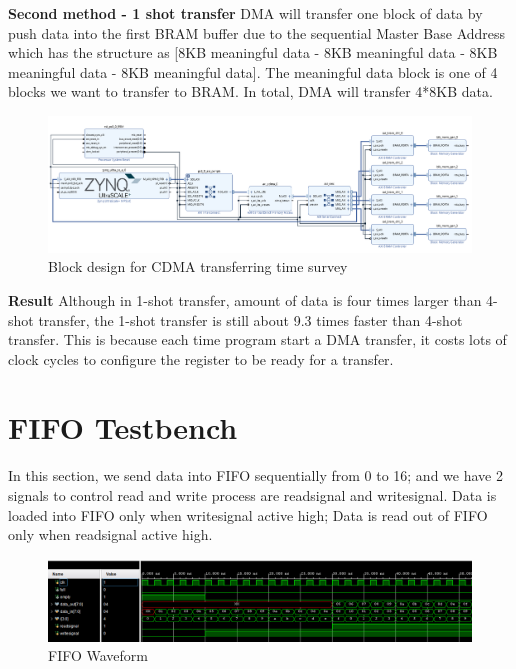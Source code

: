 \documentclass[a4paper, 12pt]{report}
\begin{document}
\textbf{Second method - 1 shot transfer } DMA will transfer one block of data by push data into the first BRAM buffer due to the sequential Master Base Address which has the structure as [8KB meaningful data - 8KB meaningful data - 8KB meaningful data - 8KB meaningful data]. The meaningful data block is one of 4 blocks we want to transfer to BRAM. In total, DMA
will transfer 4*8KB data.

\begin{figure}[H]
    \centering
    \includegraphics[width = 16cm]{picture/dma/bramtransfer.png}
    \caption{Block design for CDMA transferring time survey}
    \medskip
\end{figure}

\textbf{Result}  Although in 1-shot transfer, amount of data is four times larger than 4-shot transfer, the 1-shot transfer is still about 9.3 times faster than 4-shot transfer. This is because each time program start a DMA transfer, it costs lots of clock cycles to configure the register to be ready for a transfer.

\section{FIFO Testbench}
In this section, we send data into FIFO sequentially from 0 to 16; and we have 2 signals to control read and write process are readsignal and writesignal. Data is loaded into FIFO only when writesignal active high; Data is read out of FIFO only when readsignal active high.

\begin{figure}[H]
    \centering
    \includegraphics[width = 16cm]{picture/result/FIFO/waveformFIFOpng.png}
    \caption{FIFO Waveform}
    \medskip
\end{figure}
\end{document}
